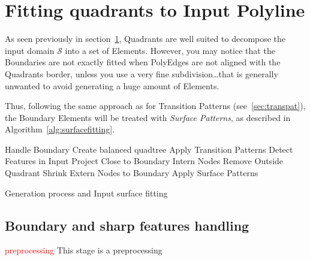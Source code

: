 \documentclass[10pt]{article}
\begin{document}
\section{Fitting quadrants to Input Polyline}
\label{sec:method}

As seen previously in section~\ref{sec:method}, Quadrants are well suited to decompose the input  domain $\mathcal{S}$ into a set of Elements. However, you may notice that the Boundaries are not exactly fitted when PolyEdges are not aligned with the Quadrants border, unless you use a very fine subdivision\ldots that is generally unwanted to avoid generating a huge amount of Elements.

Thus, following the same approach as for Transition Patterns (see~\ref{sec:transpat}), the Boundary Elements will be treated with \textit{Surface Patterns}, as described in Algorithm~\ref{alg:surfacefitting}.\\

\begin{algorithm}[H]
%
\setcounter{AlgoLine}{-1}
\SetAlgoLined
{}
\nl   Handle Boundary\; \label{alg:bound2}
\nl {}
\nl Create balanced quadtree\; \label{alg:goto2}
 \nl Apply Transition Patterns\;
 \nl Detect Features in Input\;
 \nl  Project Close to Boundary Intern Nodes\; \label{alg:closeto2}
  \nl Remove Outside Quadrant\; \label{alg:remsur2}
  \nl Shrink Extern Nodes to Boundary\; \label{alg:shrink2}
 \nl Apply Surface Patterns\; \label{alg:surfpat2}
 \caption{Generation process and Input surface fitting}
 \label{alg:surfacefitting}
\end{algorithm}

\subsection{Boundary and sharp features handling}
\label{sec:boundary}

\textcolor{red}{preprocessing}
This stage is a preprocessing 
\end{document}
